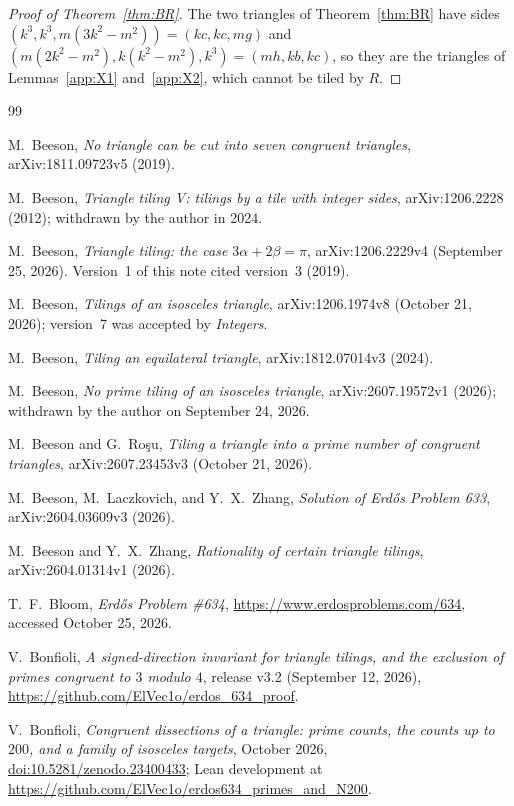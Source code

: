 \documentclass[11pt]{amsart}
\theoremstyle{remark}
\begin{document}
\begin{proof}[Proof of Theorem~\ref{thm:BR}]
The two triangles of Theorem~\ref{thm:BR} have sides $(k^3,k^3,m(3k^2-m^2))=(kc,kc,mg)$ and $(m(2k^2-m^2),k(k^2-m^2),k^3)=(mh,kb,kc)$, so they are the triangles of Lemmas~\ref{app:X1} and~\ref{app:X2}, which cannot be tiled by $R$.
\end{proof}

\begin{thebibliography}{99}

M.~Beeson,
\emph{No triangle can be cut into seven congruent triangles},
arXiv:1811.09723v5 (2019).

M.~Beeson,
\emph{Triangle tiling V: tilings by a tile with integer sides},
arXiv:1206.2228 (2012); withdrawn by the author in 2024.

M.~Beeson,
\emph{Triangle tiling: the case $3\alpha+2\beta=\pi$},
arXiv:1206.2229v4 (September 25, 2026). Version~1 of this note cited version~3 (2019).

M.~Beeson,
\emph{Tilings of an isosceles triangle},
arXiv:1206.1974v8 (October 21, 2026); version~7 was accepted by \emph{Integers}.

M.~Beeson,
\emph{Tiling an equilateral triangle},
arXiv:1812.07014v3 (2024).

M.~Beeson,
\emph{No prime tiling of an isosceles triangle},
arXiv:2607.19572v1 (2026); withdrawn by the author on September 24, 2026.

M.~Beeson and G.~Ro\c{s}u,
\emph{Tiling a triangle into a prime number of congruent triangles},
arXiv:2607.23453v3 (October 21, 2026).

M.~Beeson, M.~Laczkovich, and Y.~X.~Zhang,
\emph{Solution of Erd\H{o}s Problem 633},
arXiv:2604.03609v3 (2026).

M.~Beeson and Y.~X.~Zhang,
\emph{Rationality of certain triangle tilings},
arXiv:2604.01314v1 (2026).

T.~F.~Bloom,
\emph{Erd\H{o}s Problem \#634},
\url{https://www.erdosproblems.com/634}, accessed October 25, 2026.

V.~Bonfioli,
\emph{A signed-direction invariant for triangle tilings, and the exclusion of primes congruent to $3$ modulo $4$},
release v3.2 (September 12, 2026), \url{https://github.com/ElVec1o/erdos_634_proof}.

V.~Bonfioli,
\emph{Congruent dissections of a triangle: prime counts, the counts up to $200$, and a family of isosceles targets},
October 2026, \href{https://doi.org/10.5281/zenodo.23400433}{doi:10.5281/zenodo.23400433}; Lean development at \url{https://github.com/ElVec1o/erdos634_primes_and_N200}.


\end{thebibliography}
\end{document}
